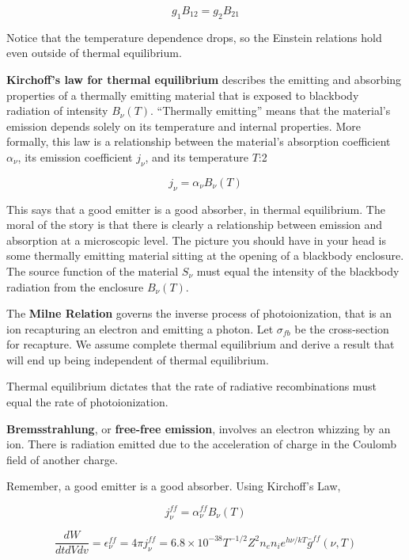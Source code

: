 \documentclass[12pt, letterpaper, preprint]{aastex}
\begin{document}
\begin{enumerate}
\begin{equation}
  g_1 B_{12} = g_2 B_{21}
  \label{einstein-B}
\end{equation}

Notice that the temperature dependence drops,
so the Einstein relations hold even outside of
thermal equilibrium.

\textbf{Kirchoff's law for thermal equilibrium}
describes the emitting and absorbing properties
of a thermally emitting material that is exposed
to blackbody radiation of intensity $B_\nu(T)$.
``Thermally emitting'' means that the material's emission
depends solely on its temperature and internal properties.
More formally, this law is a relationship between
the material's absorption coefficient $\alpha_\nu$,
its emission coefficient $j_\nu$,
and its temperature $T$:2

\begin{equation}
  j_\nu = \alpha_\nu B_\nu (T)
  \label{kirchoff-law}
\end{equation}

This says that a good emitter is a good absorber, in
thermal equilibrium. The moral of the story is that
there is clearly a relationship between emission
and absorption at a microscopic level.
The picture you should have in your head is some
thermally emitting material 
sitting at the opening of a blackbody enclosure. 
The source function of the material $S_\nu$ must equal
the intensity of the blackbody radiation from the
enclosure $B_\nu (T)$. 

The \textbf{Milne Relation} governs the inverse process
of photoionization, that is an ion recapturing an electron
and emitting a photon. Let $\sigma_{fb}$ be the cross-section
for recapture. We assume complete thermal equilibrium
and derive a result that will end up being independent of
thermal equilibrium. 

Thermal equilibrium dictates that the rate of radiative
recombinations must equal the rate of photoionization.

\textbf{Bremsstrahlung}, or \textbf{free-free emission},
involves an electron whizzing by an ion. There is radiation
emitted due to the acceleration of charge in the Coulomb field
of another charge.

Remember, a good emitter is a good absorber. Using Kirchoff's Law,

$$ j_\nu^{ff} = \alpha_\nu^{ff} B_\nu (T) $$

\begin{equation}
  \frac{dW}{dt dV dv} = \epsilon_\nu^{ff} = 4 \pi j_\nu^{ff} 
  = 6.8 \times 10^{-38} T^{-1/2} Z^2 n_e n_i e^{h \nu / kT}
  \bar{g}^{ff} (\nu,T)
  \label{bremsstrahlung}
\end{equation}


\end{enumerate}
\end{document}
